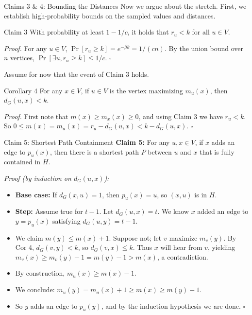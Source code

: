 \documentclass{beamer}
\begin{document}
\begin{frame}{Claims 3 \& 4: Bounding the Distances}
    Now we argue about the stretch. First, we establish high-probability bounds on the sampled values and distances.
    
    \vspace{0.2cm}
    \begin{block}{Claim 3}
        With probability at least $1 - 1/c$, it holds that $r_u < k$ for all $u \in V$.
    \end{block}
    \small
    \textit{Proof.} For any $u \in V$, $\Pr[r_u \ge k] = e^{-\beta k} = 1/(cn)$. By the union bound over $n$ vertices, $\Pr[\exists u, r_u \ge k] \le 1/c$. \hfill $\square$
    
    \vspace{0.3cm}
    \normalsize
    Assume for now that the event of Claim 3 holds.
    
    \vspace{0.2cm}
    \begin{block}{Corollary 4}
        For any $x \in V$, if $u \in V$ is the vertex maximizing $m_u(x)$, then $d_G(u,x) < k$.
    \end{block}
    \small
    \textit{Proof.} First note that $m(x) \ge m_x(x) \ge 0$, and using Claim 3 we have $r_u < k$. So $0 \le m(x) = m_u(x) = r_u - d_G(u,x) < k - d_G(u,x)$. \hfill $\square$
\end{frame}

\begin{frame}{Claim 5: Shortest Path Containment}
    \textbf{Claim 5:} For any $u, x \in V$, if $x$ adds an edge to $p_u(x)$, then there is a shortest path $P$ between $u$ and $x$ that is fully contained in $H$.
    
    \vspace{0.2cm}
    \small
    \textit{Proof (by induction on $d_G(u,x)$):}
    \begin{itemize}
        \item \textbf{Base case:} If $d_G(x,u) = 1$, then $p_u(x) = u$, so $(x,u)$ is in $H$.
        \item \textbf{Step:} Assume true for $t-1$. Let $d_G(u,x) = t$. We know $x$ added an edge to $y = p_u(x)$ satisfying $d_G(u,y) = t - 1$.
        \item We claim $m(y) \le m(x) + 1$. Suppose not; let $v$ maximize $m_v(y)$. By Cor 4, $d_G(v,y) < k$, so $d_G(v,x) \le k$. Thus $x$ will hear from $v$, yielding $m_v(x) \ge m_v(y) - 1 = m(y) - 1 > m(x)$, a contradiction.
        \item By construction, $m_u(x) \ge m(x) - 1$.
        \item We conclude: $m_u(y) = m_u(x) + 1 \ge m(x) \ge m(y) - 1$.
        \item So $y$ adds an edge to $p_u(y)$, and by the induction hypothesis we are done. \hfill $\square$
    \end{itemize}
\end{frame}
\end{document}
